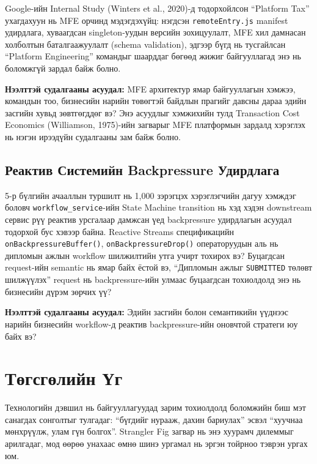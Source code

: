 Google-ийн Internal Study (Winters et al., 2020)-д тодорхойлсон
``Platform Tax'' ухагдахуун нь MFE орчинд мэдэгдэхүйц: нэгдсэн
\texttt{remoteEntry.js} manifest удирдлага, хуваагдсан singleton-уудын
версийн зохицуулалт, MFE хил дамнасан холболтын баталгаажуулалт
(schema validation), эдгээр бүгд нь тусгайлсан ``Platform Engineering''
командыг шаарддаг бөгөөд жижиг байгууллагад энэ нь боломжгүй зардал
байж болно.

\textbf{Нээлттэй судалгааны асуудал:} MFE архитектур ямар байгууллагын
хэмжээ, командын тоо, бизнесийн нарийн төвөгтэй байдлын прагийг давсны
дараа эдийн засгийн хувьд зөвтгөгддөг вэ? Энэ асуудлыг хэмжихийн тулд
Transaction Cost Economics (Williamson, 1975)-ийн загварыг MFE платформын
зардалд хэрэглэх нь нэгэн ирээдүйн судалгааны зам байж болно.

\subsection{Реактив Системийн Backpressure Удирдлага}

5-р бүлгийн ачааллын туршилт нь 1,000 зэрэгцэх хэрэглэгчийн дагуу
хэмждэг боловч \texttt{workflow\_service}-ийн State Machine transition нь
хэд хэдэн downstream сервис рүү реактив урсгалаар дамжсан үед backpressure
удирдлагын асуудал тодорхой бус хэвээр байна. Reactive Streams
спецификацийн \texttt{onBackpressureBuffer()},
\texttt{onBackpressureDrop()} операторуудын аль нь дипломын ажлын
workflow шилжилтийн утга учирт тохирох вэ? Буцагдсан request-ийн semantic
нь ямар байх ёстой вэ, ``Дипломын ажлыг \texttt{SUBMITTED} төлөвт
шилжүүлэх'' request нь backpressure-ийн улмаас буцаагдсан тохиолдолд
энэ нь бизнесийн дүрэм зөрчих үү?

\textbf{Нээлттэй судалгааны асуудал:} Эдийн засгийн болон семантикийн
үүднээс нарийн бизнесийн workflow-д реактив backpressure-ийн оновчтой
стратеги юу байх вэ?

\section{Төгсгөлийн Үг}

Технологийн дэвшил нь байгууллагуудад зарим тохиолдолд боломжийн биш мэт
санагдах сонголтыг тулгадаг: ``бүгдийг нурааж, дахин бариулах'' эсвэл
``хуучнаа мөнхрүүлж, улам гүн болгох''. Strangler Fig загвар нь энэ
хуурамч дилеммыг арилгадаг, мод өөрөө унахаас өмнө шинэ ургамал нь
эргэн тойрноо тэврэн ургах юм.

